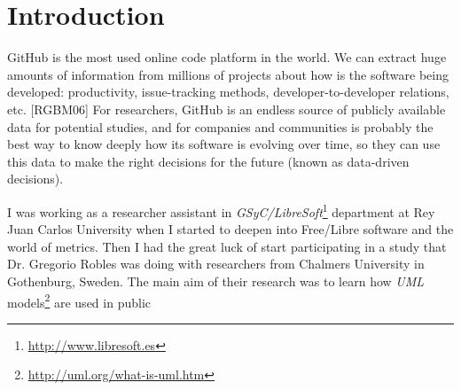 \documentclass[a4paper, 12pt]{book}
\begin{document}
\tableofcontents
\cleardoublepage
\listoffigures %


\cleardoublepage
\chapter{Introduction}
\label{sec:intro} %
GitHub is the most used online code platform in the world. We can extract huge amounts of information from millions of projects
about how is the software being developed: productivity, issue-tracking methods, developer-to-developer relations, etc. [RGBM06]
For researchers, GitHub is an endless source of publicly available data for potential studies, and for companies and communities
is probably the best way to know deeply how its software is evolving over time, so they can use this data to make the right decisions
for the future (known as data-driven decisions).\par
I was working as a researcher assistant in \emph{GSyC/LibreSoft}\footnote{\url{http://www.libresoft.es}} department at
Rey Juan Carlos University when I started to deepen into Free/Libre software and the world of metrics.
Then I had the great luck of start participating in a study that
Dr. Gregorio Robles was doing with researchers from Chalmers University in Gothenburg, Sweden. The main aim of their research was to
learn how \emph{UML} models\footnote{\url{http://uml.org/what-is-uml.htm}} are used in public
\end{document}
